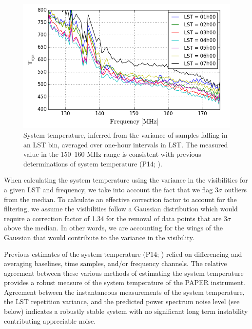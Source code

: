 \documentclass[twocolumn,numberedappendix]{emulateapj} \shorttitle{PSA64}
\begin{document}
\begin{figure}\centering
\includegraphics[width=\columnwidth]{plots/tsys.png}
\caption{System temperature, inferred from the variance of samples falling 
in an LST bin, averaged over one-hour intervals in LST.  The measured value
in the 150--160 MHz range is consistent with previous determinations of
system temperature (P14; \citealt{jacobs_et_al2014}).
}\label{fig:tsys}
\end{figure}

When calculating the system temperature using the variance in the visibilities
for a given LST and frequency, we take into account the fact that we flag
3$\sigma$ outliers from the median. To calculate an effective correction factor
to account for the filtering, we assume the visibilities follow a Gaussian
distribution which would require a correction factor of 1.34 for the removal of
data points that are 3$\sigma$ above the median. In other words, we are
accounting for the wings of the Gaussian that would contribute to the variance
in the visibility.

Previous estimates
of the system temperature
(P14; \citealt{jacobs_et_al2014}) relied on differencing and averaging
baselines, time samples, and/or frequency channels. The relative agreement
between these various methods of estimating the system temperature provides a
robust measure of the system temperature of the PAPER instrument. Agreement
between the instantaneous measurements of the system temperature, the LST
repetition variance, and the predicted power spectrum noise level (see below)
indicates a robustly stable system with no significant long term instability
contributing appreciable noise.
\end{document}

